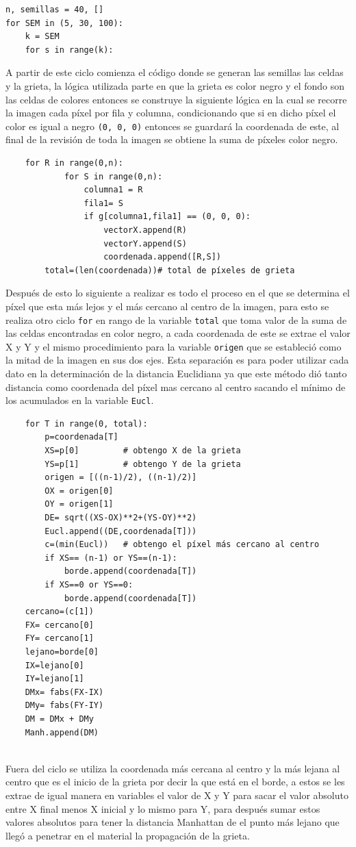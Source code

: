 \documentclass[a4paper, 11pt]{article}
\begin{document}
\begin{verbatim}
n, semillas = 40, []
for SEM in (5, 30, 100):
    k = SEM
    for s in range(k):
\end{verbatim}
A partir de este ciclo comienza el código donde se generan las semillas las celdas y la grieta, la lógica utilizada parte en que la grieta es color negro y el fondo son las celdas de colores entonces se construye la siguiente lógica en la cual se recorre la imagen cada píxel por fila y columna, condicionando que si en dicho píxel el color es igual a negro \texttt{(0, 0, 0)} entonces se guardará la coordenada de este, al final de la revisión de toda la imagen se obtiene la suma de píxeles color negro.
\begin{verbatim}
    for R in range(0,n):
            for S in range(0,n):
                columna1 = R
                fila1= S
                if g[columna1,fila1] == (0, 0, 0):
                    vectorX.append(R)
                    vectorY.append(S)
                    coordenada.append([R,S])
        total=(len(coordenada))# total de píxeles de grieta 
\end{verbatim}
Después de esto lo siguiente a realizar es todo el proceso en el que se determina el píxel que esta más lejos y el más cercano al centro de la imagen, para esto se realiza otro ciclo \texttt{for} en rango de la variable \texttt{total} que toma valor de la suma de las celdas encontradas en color negro, a cada coordenada de este se extrae el valor X y Y y el mismo procedimiento para la variable \texttt{origen} que se estableció como la mitad de la imagen en sus dos ejes. 
Esta separación es para poder utilizar cada dato en la determinación de la distancia Euclidiana ya que este método dió tanto distancia como coordenada del píxel mas cercano al centro sacando el mínimo de los acumulados en la variable \texttt{Eucl}. 

\begin{verbatim}
    for T in range(0, total):
        p=coordenada[T] 
        XS=p[0]         # obtengo X de la grieta 
        YS=p[1]         # obtengo Y de la grieta 
        origen = [((n-1)/2), ((n-1)/2)]
        OX = origen[0]
        OY = origen[1]
        DE= sqrt((XS-OX)**2+(YS-OY)**2) 
        Eucl.append((DE,coordenada[T])) 
        c=(min(Eucl))   # obtengo el píxel más cercano al centro 
        if XS== (n-1) or YS==(n-1):
            borde.append(coordenada[T])
        if XS==0 or YS==0:
            borde.append(coordenada[T])
    cercano=(c[1])      
    FX= cercano[0]
    FY= cercano[1]
    lejano=borde[0]
    IX=lejano[0]
    IY=lejano[1]
    DMx= fabs(FX-IX)
    DMy= fabs(FY-IY)
    DM = DMx + DMy       
    Manh.append(DM)
    
\end{verbatim}
Fuera del ciclo se utiliza la coordenada más cercana al centro y la más lejana al centro que es el inicio de la grieta por decir la que está en el borde, a estos se les extrae de igual manera en variables el valor de X y Y para sacar el valor absoluto entre X final menos X inicial y lo mismo para Y, para después sumar estos valores absolutos para tener la distancia Manhattan de el punto más lejano que llegó a penetrar en el material la propagación de la grieta. 
\end{document}
